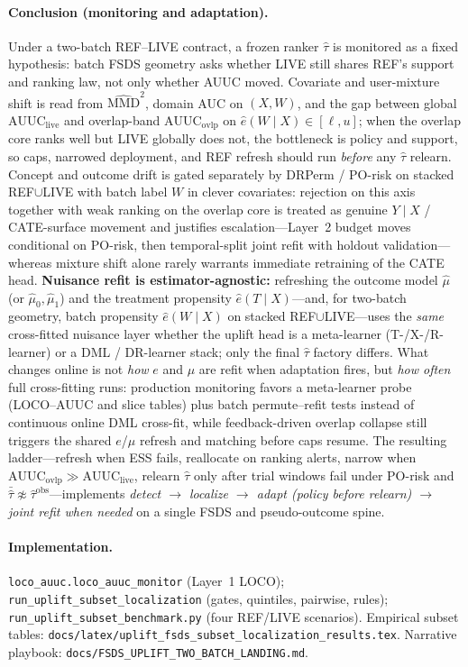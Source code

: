 \paragraph{Conclusion (monitoring and adaptation).}
Under a two-batch REF--LIVE contract, a frozen ranker $\hat\tau$ is monitored as a fixed hypothesis: batch FSDS geometry asks whether LIVE still shares REF's support and ranking law, not only whether AUUC moved.
Covariate and user-mixture shift is read from $\widehat{\mathrm{MMD}}^2$, domain AUC on $(X,W)$, and the gap between global $\mathrm{AUUC}_{\mathrm{live}}$ and overlap-band $\mathrm{AUUC}_{\mathrm{ovlp}}$ on $\hat e(W\mid X)\in[\ell,u]$; when the overlap core ranks well but LIVE globally does not, the bottleneck is policy and support, so caps, narrowed deployment, and REF refresh should run \emph{before} any $\hat\tau$ relearn.
Concept and outcome drift is gated separately by DRPerm / PO-risk on stacked REF$\cup$LIVE with batch label $W$ in clever covariates: rejection on this axis together with weak ranking on the overlap core is treated as genuine $Y\mid X$ / CATE-surface movement and justifies escalation---Layer~2 budget moves conditional on PO-risk, then temporal-split joint refit with holdout validation---whereas mixture shift alone rarely warrants immediate retraining of the CATE head.
\textbf{Nuisance refit is estimator-agnostic:} refreshing the outcome model $\hat\mu$ (or $\hat\mu_0,\hat\mu_1$) and the treatment propensity $\hat e(T\mid X)$---and, for two-batch geometry, batch propensity $\hat e(W\mid X)$ on stacked REF$\cup$LIVE---uses the \emph{same} cross-fitted nuisance layer whether the uplift head is a meta-learner (T-/X-/R-learner) or a DML / DR-learner stack; only the final $\hat\tau$ factory differs.
What changes online is not \emph{how} $e$ and $\mu$ are refit when adaptation fires, but \emph{how often} full cross-fitting runs: production monitoring favors a meta-learner probe (LOCO--AUUC and slice tables) plus batch permute--refit tests instead of continuous online DML cross-fit, while feedback-driven overlap collapse still triggers the shared $e$/$\mu$ refresh and matching before caps resume.
The resulting ladder---refresh when ESS fails, reallocate on ranking alerts, narrow when $\mathrm{AUUC}_{\mathrm{ovlp}}\gg \mathrm{AUUC}_{\mathrm{live}}$, relearn $\hat\tau$ only after trial windows fail under PO-risk and $\bar{\hat\tau}\not\approx\widehat{\tau}^{\mathrm{obs}}$---implements \emph{detect $\to$ localize $\to$ adapt (policy before relearn) $\to$ joint refit when needed} on a single FSDS and pseudo-outcome spine.

\paragraph{Implementation.}
\texttt{loco\_auuc.loco\_auuc\_monitor} (Layer~1 LOCO);
\texttt{run\_uplift\_subset\_localization} (gates, quintiles, pairwise, rules);
\texttt{run\_uplift\_subset\_benchmark.py} (four REF/LIVE scenarios).
Empirical subset tables: \verb|docs/latex/uplift_fsds_subset_localization_results.tex|.
Narrative playbook: \verb|docs/FSDS_UPLIFT_TWO_BATCH_LANDING.md|.
